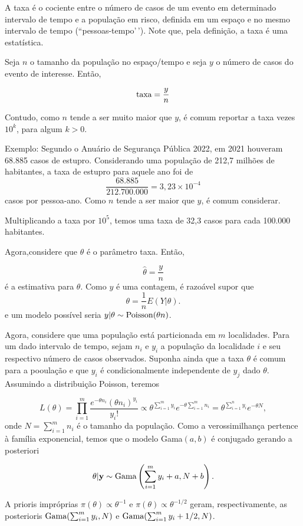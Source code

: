 \documentclass[
  letterpaper,
  DIV=11,
  numbers=noendperiod]{scrreprt}
\theoremstyle{definition}
\theoremstyle{definition}
\theoremstyle{plain}
\theoremstyle{remark}
\begin{document}
A taxa é o cociente entre o número de casos de um evento em determinado
intervalo de tempo e a população em risco, definida em um espaço e no
mesmo intervalo de tempo (``pessoas-tempo'\,'). Note que, pela
definição, a taxa é uma estatística.

Seja \(n\) o tamanho da população no espaço/tempo e seja \(y\) o número
de casos do evento de interesse. Então,

\[\hbox{taxa} = \frac{y}{n}\]

Contudo, como \(n\) tende a ser muito maior que \(y\), é comum reportar
a taxa vezes \(10^k\), para algum \(k>0\).

Exemplo: Segundo o Anuário de Segurança Pública 2022, em 2021 houveram
68.885 casos de estupro. Considerando uma população de 212,7 milhões de
habitantes, a taxa de estupro para aquele ano foi de
\[\frac{68.885}{212.700.000}=3,23\times 10^{-4}\] casos por pessoa-ano.
Como \(n\) tende a ser maior que \(y\), é comum considerar.

Multiplicando a taxa por \(10^5\), temos uma taxa de 32,3 casos para
cada 100.000 habitantes.

Agora,considere que \(\theta\) é o parâmetro taxa. Então,

\[\hat{\theta}=\frac{y}{n}\] é a estimativa para \(\theta\). Como \(y\)
é uma contagem, é razoável supor que \[\theta =\frac{1}{n}E(Y|\theta).\]
e um modelo possível seria \(y|\theta\sim\hbox{Poisson}(\theta n)\).

Agora, considere que uma população está particionada em \(m\)
localidades. Para um dado intervalo de tempo, sejam \(n_i\) e \(y_i\) a
população da localidade \(i\) e seu respectivo número de casos
observados. Suponha ainda que a taxa \(\theta\) é comum para a pooulação
e que \(y_i\) é condicionalmente independente de \(y_j\) dado
\(\theta\). Assumindo a distribuição Poisson, teremos

\[L(\theta)=\prod_{i=1}^m\frac{e^{-\theta n_i}(\theta n_i)^{y_i}}{y_i!}\varpropto \theta^{\sum_{i=1}^m y_i}e^{-\theta \sum_{i=1}^m n_i}=\theta^{\sum_{i=1}^n y_i}e^{-\theta N},\]
onde \(N=\sum_{i=1}^m n_i\) é o tamanho da população. Como a
verossimilhança pertence à família exponencial, temos que o modelo
Gama\((a,b)\) é conjugado gerando a posteriori

\[\theta|\mathbf{y}\sim\hbox{Gama}\left(\sum_{i=1}^{m}y_i+a,N+b\right).\]

A prioris impróprias \(\pi(\theta)\varpropto \theta^{-1}\) e
\(\pi(\theta)\varpropto \theta^{-1/2}\) geram, respectivamente, as
posterioris \(\hbox{Gama}(\sum_{i=1}^m y_i,N)\) e
\(\hbox{Gama}(\sum_{i=1}^m y_i+1/2,N)\).
\end{document}
